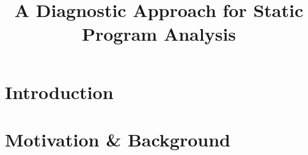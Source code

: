 \documentclass[a4paper,UKenglish]{lipics}
\title{A Diagnostic Approach for Static Program Analysis}
\author{}
\begin{document}
\maketitle

\begin{abstract}

 \end{abstract}

\section{Introduction}

\section{Motivation \& Background}
\end{document}
